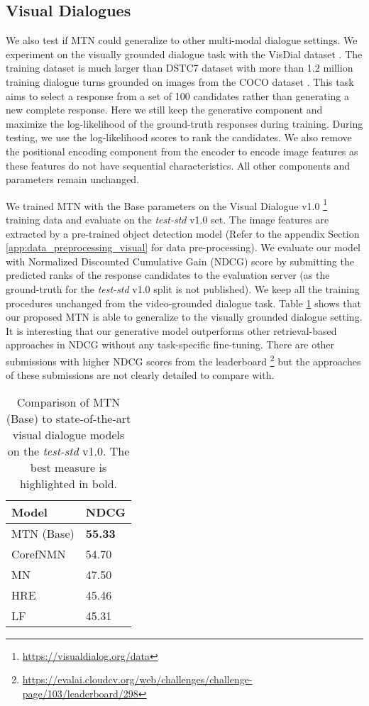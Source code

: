 \documentclass[11pt,a4paper]{article}
\begin{document}
\subsection{Visual Dialogues}

We also test if MTN could generalize to other multi-modal dialogue settings. We experiment on the visually grounded dialogue task with the VisDial dataset \cite{das2017visual}. The training dataset is much larger than DSTC7 dataset with more than 1.2 million training dialogue turns grounded on images from the COCO dataset \cite{lin2014microsoft}. This task aims to select a response from a set of 100 candidates rather than generating a new complete response. Here we still keep the generative component and maximize the log-likelihood of the ground-truth responses during training. During testing, we use the log-likelihood scores to rank the candidates. We also remove the positional encoding component from the encoder to encode image features as these features do not have sequential characteristics. All other components and parameters remain unchanged. 

We trained MTN with the Base parameters on the Visual Dialogue v1.0 \footnote{\url{https://visualdialog.org/data}} training data and evaluate on the \textit{test-std} v1.0 set. The image features are extracted by a pre-trained object detection model (Refer to the appendix Section \ref{app:data_preprocessing_visual} for data pre-processing).  
We evaluate our model with Normalized Discounted Cumulative Gain (NDCG) score by submitting the predicted ranks of the response candidates to the evaluation server (as the ground-truth for the \textit{test-std} v1.0 split is not published). We keep all the training procedures unchanged from the video-grounded dialogue task. Table \ref{tab:result_vis} shows that our proposed MTN is able to generalize to the visually grounded dialogue setting. It is interesting that our generative model outperforms other retrieval-based approaches in NDCG without any task-specific fine-tuning. There are other submissions with higher NDCG scores from the leaderboard \footnote{\url{https://evalai.cloudcv.org/web/challenges/challenge-page/103/leaderboard/298}} but the approaches of these submissions are not clearly detailed to compare with. 


\begin{table}[htbp]
\centering
\begin{tabular}{ll}
\hline
\textbf{Model} & \textbf{NDCG} \\ \hline
MTN (Base)           & \textbf{55.33}         \\ \hline
CorefNMN \cite{kottur2018visual}       & 54.70         \\ 
MN \cite{das2017visual}            & 47.50         \\ 
HRE \cite{das2017visual}         & 45.46         \\ 
LF \cite{das2017visual}            & 45.31         \\ \hline
\end{tabular}
\caption{Comparison of MTN (Base) to state-of-the-art visual dialogue models on the \textit{test-std} v1.0.  The best measure is highlighted in bold.}
\label{tab:result_vis}
\end{table}
\end{document}

